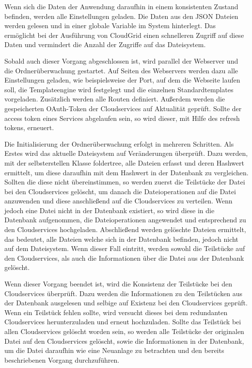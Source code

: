 Wenn sich die Daten der Anwendung daraufhin in einem konsistenten Zustand befinden, werden alle Einstellungen geladen.
Die Daten aus den \ac{JSON} Dateien werden gelesen und in einer globale Variable im System hinterlegt.
Das ermöglicht bei der Ausführung von CloudGrid einen schnelleren Zugriff auf diese Daten und vermindert die Anzahl der Zugriffe auf das Dateisystem.

Sobald auch dieser Vorgang abgeschlossen ist, wird parallel der Webserver und die Ordnerüberwachung gestartet.
Auf Seiten des Webservers werden dazu alle Einstellungen geladen, wie beispielsweise der Port, auf dem die Webseite laufen soll, die Templateengine wird festgelegt und die einzelnen Standardtemplates vorgeladen.
Zusätzlich werden alle Routen definiert.
Außerdem werden die gespeicherten OAuth-Token der Cloudservices auf Aktualität geprüft.
Sollte der access token eines Services abgelaufen sein, so wird dieser, mit Hilfe des refresh tokens, erneuert.

Die Initialisierung der Ordnerüberwachung erfolgt in mehreren Schritten.
Als Erstes wird das aktuelle Dateisystem auf Veränderungen überprüft.
Dazu werden, mit der selbsterstellen Klasse \frqq foldertree\flqq , alle Dateien erfasst und deren Hashwert ermittelt, um diese daraufhin mit dem Hashwert in der Datenbank zu vergleichen.
Sollten die diese nicht übereinstimmen, so werden zuerst die Teilstücke der Datei bei den Cloudservices gelöscht, um danach die Dateioperationen auf die Datei anzuwenden und diese anschließend auf die Cloudservices zu verteilen.
Wenn jedoch eine Datei nicht in der Datenbank existiert, so wird diese in die Datenbank aufgenommen, die Dateioperationen angewendet und entsprechend zu den Cloudservices hochgeladen.
Abschließend werden gelöschte Dateien ermittelt, das bedeutet, alle Dateien welche sich in der Datenbank befinden, jedoch nicht auf dem Dateisystem.
Wenn dieser Fall eintritt, werden sowohl die Teilstücke auf den Cloudservices, als auch die Informationen über die Datei aus der Datenbank gelöscht.

Wenn dieser Vorgang beendet ist, wird die Konsistenz der Teilstücke bei den Cloudservices überprüft.
Dazu werden die Informationen zu den Teilstücken aus der Datenbank ausgelesen und selbige auf Existenz bei den Cloudservices geprüft.
Wenn ein Teilstück fehlen sollte, wird versucht dieses bei dem redundanten Cloudservices herunterzuladen und erneut hochzuladen.
Sollte das Teilstück bei allen Cloudservices gelöscht worden sein, so werden alle Teilstücke der originalen Datei auf den Cloudservices gelöscht, sowie die Informationen in der Datenbank, um die Datei daraufhin wie eine Neuanlage zu betrachten und den bereits beschriebenen Vorgang durchzuführen.

